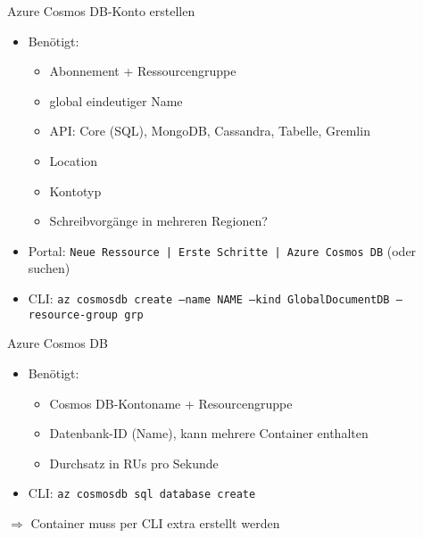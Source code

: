 \begin{flashcard}{Azure Cosmos DB-Konto erstellen}
    \begin{itemize}
        \item Benötigt:
        \begin{itemize}
            \item Abonnement + Ressourcengruppe
            \item global eindeutiger Name
            \item API: Core (SQL), MongoDB, Cassandra, Tabelle, Gremlin
            \item Location
            \item Kontotyp
            \item Schreibvorgänge in mehreren Regionen?
        \end{itemize}
        \item Portal: \texttt{Neue Ressource | Erste Schritte | Azure Cosmos DB} (oder suchen)
        \item CLI:\newline
        \texttt{az cosmosdb create --name NAME --kind GlobalDocumentDB --resource-group grp}
    \end{itemize}
\end{flashcard}

\begin{flashcard}{Azure Cosmos DB}
    \begin{itemize}
        \item Benötigt:
        \begin{itemize}
            \item Cosmos DB-Kontoname + Resourcengruppe
            \item Datenbank-ID (Name), kann mehrere Container enthalten
            \item Durchsatz in RUs pro Sekunde
        \end{itemize}
        \item CLI:\newline
        \texttt{az cosmosdb sql database create}
    \end{itemize}
    $\Rightarrow$ Container muss per CLI extra erstellt werden
\end{flashcard}


